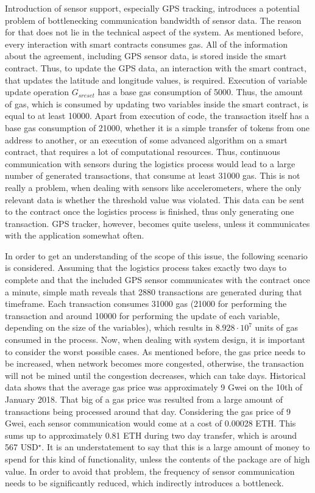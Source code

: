 Introduction of sensor support, especially GPS tracking, introduces a potential problem of bottlenecking communication bandwidth of sensor data. The reason for that does not lie in the technical aspect of the system. As mentioned before, every interaction with smart contracts consumes gas. All of the information about the agreement, including GPS sensor data, is stored inside the smart contract. Thus, to update the GPS data, an interaction with the smart contract, that updates the latitude and longitude values, is required. Execution of variable update operation $G_{sreset}$ has a base gas consumption of 5000. Thus, the amount of gas, which is consumed by updating two variables inside the smart contract, is equal to at least 10000. Apart from execution of code, the transaction itself has a base gas consumption of 21000, whether it is a simple transfer of tokens from one address to another, or an execution of some advanced algorithm on a smart contract, that requires a lot of computational resources. Thus, continuous communication with sensors during the logistics process would lead to a large number of generated transactions, that consume at least 31000 gas. This is not really a problem, when dealing with sensors like accelerometers, where the only relevant data is whether the threshold value was violated. This data can be sent to the contract once the logistics process is finished, thus only generating one transaction. GPS tracker, however, becomes quite useless, unless it communicates with the application somewhat often.

In order to get an understanding of the scope of this issue, the following scenario is considered. Assuming that the logistics process takes exactly two days to complete and that the included GPS sensor communicates with the contract once a minute, simple math reveals that 2880 transactions are generated during that timeframe. Each transaction consumes 31000 gas (21000 for performing the transaction and around 10000 for performing the update of each variable, depending on the size of the variables), which results in $8.928 \cdot 10^7$ units of gas consumed in the process. Now, when dealing with system design, it is important to consider the worst possible cases. As mentioned before, the gas price needs to be increased, when network becomes more congested, otherwise, the transaction will not be mined until the congestion decreases, which can take days. Historical data shows that the average gas price was approximately 9 Gwei on the 10th of January 2018. That big of a gas price was resulted from a large amount of transactions being processed around that day. Considering the gas price of 9 Gwei, each sensor communication would come at a cost of 0.00028 ETH. This sums up to approximately 0.81 ETH during two day transfer, which is around 567 USD$^\star$. It is an understatement to say that this is a large amount of money to spend for this kind of functionality, unless the contents of the package are of high value. In order to avoid that problem, the frequency of sensor communication needs to be significantly reduced, which indirectly introduces a bottleneck.

